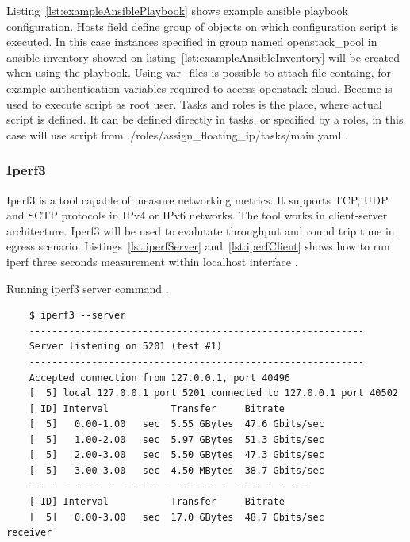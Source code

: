 Listing~\ref{lst:exampleAnsiblePlaybook} shows example ansible playbook configuration. Hosts field define group of objects on which configuration script is executed. In this case instances specified in group named openstack\_pool in ansible inventory showed on listing~\ref{lst:exampleAnsibleInventory} will be created when using the playbook. Using var\_files is possible to attach file containg, for example authentication variables required to access openstack cloud. Become is used to execute script as root user. Tasks and roles is the place, where actual script is defined. It can be defined directly in tasks, or specified by a roles, in this case will use script from ./roles/assign\_floating\_ip/tasks/main.yaml \cite{AnsiblePlaybook}.


\subsubsection{Iperf3}
\label{sec:iperf3}

Iperf3 is a tool capable of measure networking metrics. It supports TCP, UDP and SCTP protocols in IPv4 or IPv6 networks. The tool works in client-server architecture. Iperf3 will be used to evalutate throughput and round trip time in egress scenario. Listings~\ref{lst:iperfServer} and~\ref{lst:iperfClient} shows how to run iperf three seconds measurement within localhost interface \cite{Iperf}.

\begin{listing}[H]
    \centering
    \caption{Running iperf3 server command \cite{IperfDocs}.}
    \begin{verbatim}
    $ iperf3 --server
    -----------------------------------------------------------
    Server listening on 5201 (test #1)
    -----------------------------------------------------------
    Accepted connection from 127.0.0.1, port 40496
    [  5] local 127.0.0.1 port 5201 connected to 127.0.0.1 port 40502
    [ ID] Interval           Transfer     Bitrate
    [  5]   0.00-1.00   sec  5.55 GBytes  47.6 Gbits/sec                  
    [  5]   1.00-2.00   sec  5.97 GBytes  51.3 Gbits/sec                  
    [  5]   2.00-3.00   sec  5.50 GBytes  47.3 Gbits/sec                  
    [  5]   3.00-3.00   sec  4.50 MBytes  38.7 Gbits/sec                  
    - - - - - - - - - - - - - - - - - - - - - - - - -
    [ ID] Interval           Transfer     Bitrate
    [  5]   0.00-3.00   sec  17.0 GBytes  48.7 Gbits/sec                  receiver
    \end{verbatim}
    \label{lst:iperfServer}
\end{listing}

